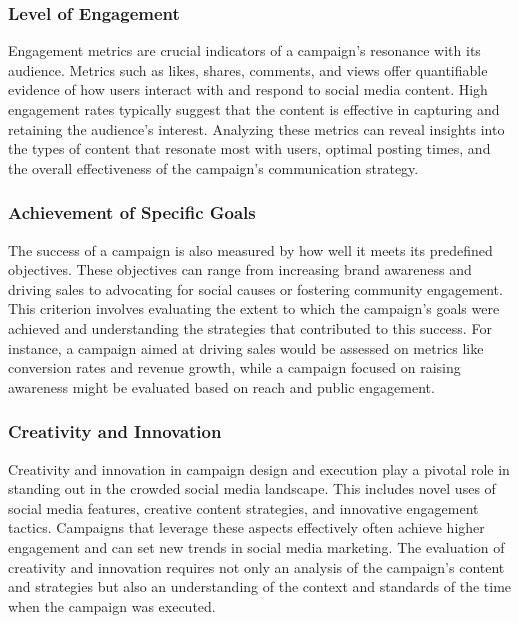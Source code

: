 \documentclass[
]{book}
\begin{document}
\hypertarget{level-of-engagement}{%
\subsubsection*{Level of Engagement}\label{level-of-engagement}}

Engagement metrics are crucial indicators of a campaign's resonance with its audience. Metrics such as likes, shares, comments, and views offer quantifiable evidence of how users interact with and respond to social media content. High engagement rates typically suggest that the content is effective in capturing and retaining the audience's interest. Analyzing these metrics can reveal insights into the types of content that resonate most with users, optimal posting times, and the overall effectiveness of the campaign's communication strategy.

\hypertarget{achievement-of-specific-goals}{%
\subsubsection*{Achievement of Specific Goals}\label{achievement-of-specific-goals}}

The success of a campaign is also measured by how well it meets its predefined objectives. These objectives can range from increasing brand awareness and driving sales to advocating for social causes or fostering community engagement. This criterion involves evaluating the extent to which the campaign's goals were achieved and understanding the strategies that contributed to this success. For instance, a campaign aimed at driving sales would be assessed on metrics like conversion rates and revenue growth, while a campaign focused on raising awareness might be evaluated based on reach and public engagement.

\hypertarget{creativity-and-innovation}{%
\subsubsection*{Creativity and Innovation}\label{creativity-and-innovation}}

Creativity and innovation in campaign design and execution play a pivotal role in standing out in the crowded social media landscape. This includes novel uses of social media features, creative content strategies, and innovative engagement tactics. Campaigns that leverage these aspects effectively often achieve higher engagement and can set new trends in social media marketing. The evaluation of creativity and innovation requires not only an analysis of the campaign's content and strategies but also an understanding of the context and standards of the time when the campaign was executed.
\end{document}
